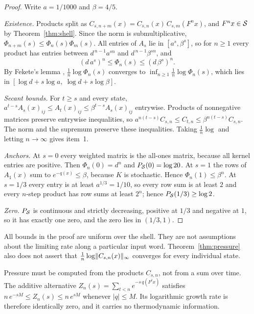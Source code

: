 \begin{proof}
Write $a=1/1000$ and $\beta=4/5$.

\emph{Existence.} Products split as $C_{s,n+m}(x)=C_{s,n}(x)\,C_{s,m}(F^nx)$, and $F^nx\in\mathcal{S}$ by Theorem~\ref{thm:shell}. Since the norm is submultiplicative, $\Phi_{n+m}(s)\le\Phi_n(s)\Phi_m(s)$. All entries of $A_s$ lie in $[a^s,\beta^s]$, so for $n\ge1$ every product has entries between $d^{\,n-1}a^{sn}$ and $d^{\,n-1}\beta^{sn}$, and
\[
(d\,a^{s})^{n}\le\Phi_n(s)\le(d\,\beta^{s})^{n}.
\]
By Fekete's lemma \cite{Fekete1923DistributionRoots}, $\frac1n\log\Phi_n(s)$ converges to $\inf_{n\ge1}\frac1n\log\Phi_n(s)$, which lies in $[\log d+s\log a,\;\log d+s\log\beta]$.

\emph{Secant bounds.} For $t\ge s$ and every state, $a^{t-s}A_s(x)_{ij}\le A_t(x)_{ij}\le\beta^{t-s}A_s(x)_{ij}$ entrywise. Products of nonnegative matrices preserve entrywise inequalities, so $a^{n(t-s)}C_{s,n}\le C_{t,n}\le\beta^{n(t-s)}C_{s,n}$. The norm and the supremum preserve these inequalities. Taking $\frac1n\log$ and letting $n\to\infty$ gives item~1.

\emph{Anchors.} At $s=0$ every weighted matrix is the all-ones matrix, because all kernel entries are positive. Then $\Phi_n(0)=d^n$ and $P_{\mathcal{S}}(0)=\log 20$. At $s=1$ the rows of $A_1(x)$ sum to $e^{-q(x)}\le\beta$, because $K$ is stochastic. Hence $\Phi_n(1)\le\beta^n$. At $s=1/3$ every entry is at least $a^{1/3}=1/10$, so every row sum is at least $2$ and every $n$-step product has row sums at least $2^n$; hence $P_{\mathcal{S}}(1/3)\ge\log 2$.

\emph{Zero.} $P_{\mathcal{S}}$ is continuous and strictly decreasing, positive at $1/3$ and negative at $1$, so it has exactly one zero, and the zero lies in $(1/3,1)$.
\end{proof}

All bounds in the proof are uniform over the shell. They are not assumptions about the limiting rate along a particular input word. Theorem~\ref{thm:pressure} also does not assert that $\frac1n\log\lVert C_{s,n}(x)\rVert_{\infty}$ converges for every individual state.

\begin{remark}
Pressure must be computed from the products $C_{s,n}$, not from a sum over time. The additive alternative $Z_n(s)=\sum_{t<n}e^{-s\,q(F^tx)}$ satisfies $n\,e^{-sM}\le Z_n(s)\le n\,e^{sM}$ whenever $|q|\le M$. Its logarithmic growth rate is therefore identically zero, and it carries no thermodynamic information.
\end{remark}

